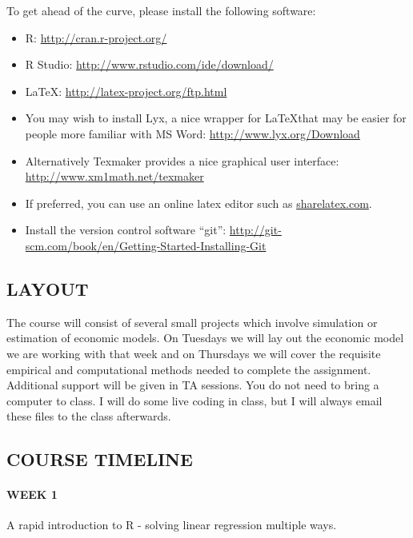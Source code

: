 \documentclass{scrartcl}
\begin{document}
To get ahead of the curve, please install the following software:
\begin{itemize}
\item R: \href{http://cran.r-project.org/}{http://cran.r-project.org/}
\item R Studio: \href{http://www.rstudio.com/ide/download/}{http://www.rstudio.com/ide/download/}
\item \LaTeX: \href{http://latex-project.org/ftp.html}{http://latex-project.org/ftp.html}
\item You may wish to install Lyx, a nice wrapper for \LaTeX that may be easier for people more familiar with MS Word: \href{http://www.lyx.org/Download}{http://www.lyx.org/Download}
\item Alternatively Texmaker provides a nice graphical user interface: \href{http://www.xm1math.net/texmaker}{http://www.xm1math.net/texmaker}
\item If preferred, you can use an online latex editor such as \href{sharelatex.com}{sharelatex.com}.
\item Install the version control software ``git'': \href{http://git-scm.com/book/en/Getting-Started-Installing-Git}{http://git-scm.com/book/en/Getting-Started-Installing-Git}
\end{itemize}

\subsection*{LAYOUT}

The course will consist of several small projects which involve simulation or estimation of economic models. On Tuesdays we will lay out the economic model we are working with that week and on Thursdays we will cover the requisite empirical and computational methods needed to complete the assignment. Additional support will be given in TA sessions. You do not need to bring a computer to class. I will do some live coding in class, but I will always email these files to the class afterwards. 


\subsection*{COURSE TIMELINE}

\paragraph{WEEK 1} 
A rapid introduction to R - solving linear regression multiple ways.
\end{document}

